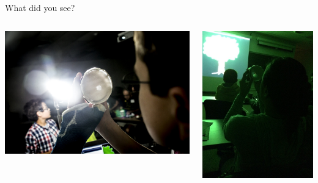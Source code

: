 \begin{frame}{What did you see?}
  \begin{columns}
    \begin{column}{0.5\textwidth}
      \includegraphics[width=\textwidth]{media/example-proj-bulb.jpg}%
    \end{column}
    \begin{column}{0.5\textwidth}
      \includegraphics[width=\textwidth]{media/xplore_pinhole_photo3.jpg}
    \end{column}
  \end{columns}
\end{frame}

